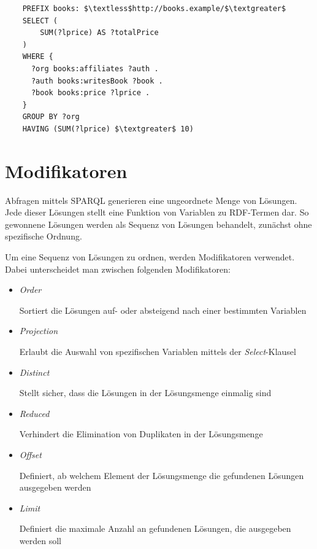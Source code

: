 \lstset{language=SQL}
\begin{lstlisting}
    PREFIX books: $\textless$http://books.example/$\textgreater$
    SELECT (
        SUM(?lprice) AS ?totalPrice
    )
    WHERE {
      ?org books:affiliates ?auth .
      ?auth books:writesBook ?book .
      ?book books:price ?lprice .
    }
    GROUP BY ?org
    HAVING (SUM(?lprice) $\textgreater$ 10)
\end{lstlisting}
    
\section{Modifikatoren}
\label{sec:sparql_modifikatoren}
Abfragen mittels SPARQL generieren eine ungeordnete Menge von Lösungen. Jede dieser Lösungen stellt eine Funktion von Variablen zu RDF-Termen dar. So gewonnene Lösungen werden als Sequenz von Lösungen behandelt, zunächst ohne spezifische Ordnung.~\cite[15 Solution Sequences and Modifiers]{w3sparql_querylang}

Um eine Sequenz von Lösungen zu ordnen, werden Modifikatoren verwendet.\\
Dabei unterscheidet man zwischen folgenden Modifikatoren:

\begin{itemize}
    \item \textit{Order}

        Sortiert die Lösungen auf- oder absteigend nach einer bestimmten Variablen

    \item \textit{Projection}

        Erlaubt die Auswahl von spezifischen Variablen mittels der \textit{Select}-Klausel

    \item \textit{Distinct}

        Stellt sicher, dass die Lösungen in der Lösungsmenge einmalig sind

    \item \textit{Reduced}

        Verhindert die Elimination von Duplikaten in der Lösungsmenge

    \item \textit{Offset}

        Definiert, ab welchem Element der Lösungsmenge die gefundenen Lösungen ausgegeben werden

    \item \textit{Limit}

        Definiert die maximale Anzahl an gefundenen Lösungen, die ausgegeben werden soll

\end{itemize}

